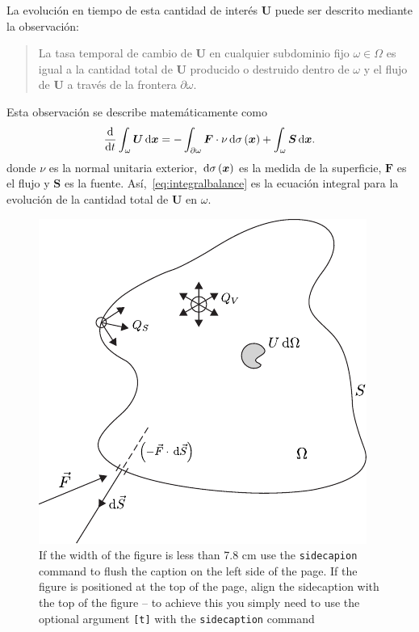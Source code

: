 La evolución en tiempo de esta cantidad de interés $\bm{U}$
puede ser descrito mediante la observación:
\begin{quote}
	La tasa temporal de cambio de $\bm{U}$ en cualquier subdominio
	fijo $\omega\in\Omega$ es igual a la cantidad total de
	$\bm{U}$ producido o destruido dentro de $\omega$ y el flujo
	de $\bm{U}$ a través de la frontera $\partial\omega$.
\end{quote}
Esta observación se describe matemáticamente como
\begin{equation}\label{eq:integralbalance}
	\diff{}{t}
	\int_{\omega}
	\bm{U}\dl{\bm{x}}=
	-\int_{\partial\omega}
	\bm{F}\cdot\nu\dl{\sigma\left(\bm{x}\right)}+
	\int_{\omega}
	\bm{S}\dl{\bm{x}}.
\end{equation}
donde $\nu$ es la normal unitaria exterior,
$\dl{\sigma\left(\bm{x}\right)}$ es la medida de la superficie,
$\bm{F}$ es el flujo y $\bm{S}$ es la fuente.
Así,~\eqref{eq:integralbalance} es la ecuación integral para la
evolución de la cantidad total de $\bm{U}$ en $\omega$.
\begin{figure}[b]
	\sidecaption
	\includegraphics{conservationscheme}
	\caption{If the width of the figure is less than 7.8 cm use the
		\texttt{sidecapion} command to flush the caption on the left side of the page.
		If the figure is positioned at the top of the page, align the sidecaption with
		the top of the figure -- to achieve this you simply need to use the optional
		argument \texttt{[t]} with the \texttt{sidecaption} command}
	\label{fig:1}       %
\end{figure}
